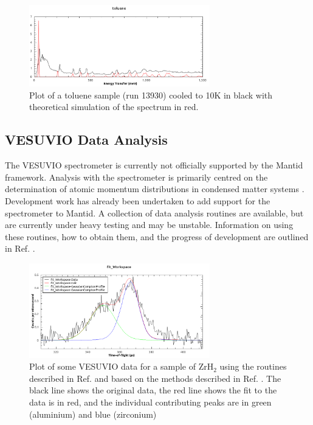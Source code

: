 \documentclass[paper=a4, fontsize=11pt]{scrartcl}	%
\numberwithin{equation}{section}															%
\numberwithin{figure}{section}																%
\numberwithin{table}{section}																%
\begin{document}
\begin{figure}[H]
\centering
\includegraphics[width=0.7\textwidth]{img/tosca-analysis.png}
\caption{Plot of a toluene sample (run 13930) cooled to 10K in black with theoretical simulation of the spectrum in red.}
\label{fig:tosca-analysis}
\end{figure}


\subsection{VESUVIO Data Analysis}
The VESUVIO spectrometer is currently not officially supported by the Mantid framework. Analysis with the spectrometer is primarily centred on the determination of atomic momentum distributions in condensed matter systems \cite{mayers2012vesuvio}. Development work has already been undertaken to add support for the spectrometer to Mantid. A collection of data analysis routines are available, but are currently under heavy testing and may be unstable. Information on using these routines, how to obtain them, and the progress of development are outlined in Ref. \cite{jackson2014vesuvio}.

\begin{figure}[H]
\centering
\includegraphics[width=0.7\textwidth]{img/gaussian-fit-example.png}
\caption{Plot of some VESUVIO data for a sample of ZrH$_2$ using the routines described in Ref. \cite{jackson2014vesuvio} and based on the methods described in Ref. \cite{mayers2012vesuvio}. The black line shows the original data, the red line shows the fit to the data is in red, and the individual contributing peaks are in green (aluminium) and blue (zirconium)}
\label{fig:vesuvio-gaussian-fit}
\end{figure}
\end{document}
